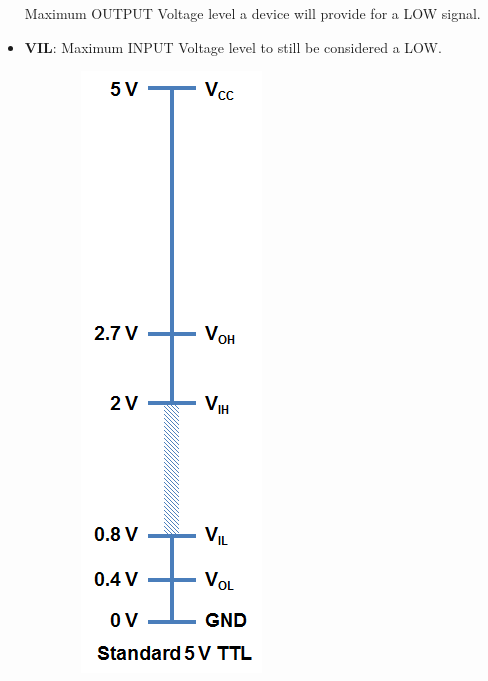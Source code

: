 \begin{itemize}
 Maximum OUTPUT Voltage level a device will provide for a LOW signal.
\item \textbf{VIL}: Maximum INPUT Voltage level to still be considered a LOW.
\end{itemize}

\begin{figure}[H]
  \centering
  \begin{subfigure}[c]{0.15\textwidth}
    \includegraphics[width=\textwidth,frame]{TTL1}

\end{subfigure}
\end{figure}

